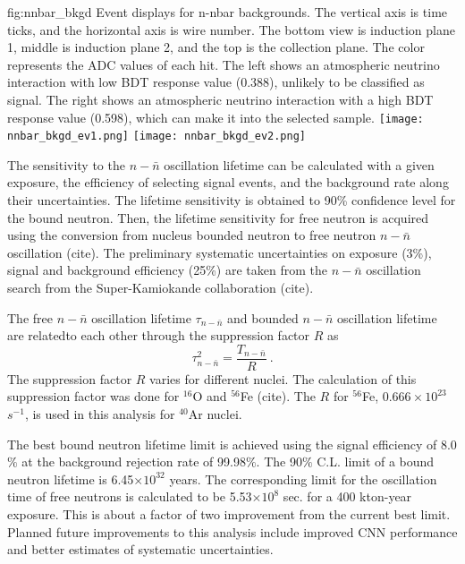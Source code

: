 \begin{dunefigure}
{fig:nnbar_bkgd}
{Event displays for n-nbar backgrounds.  The vertical axis is time ticks, and the horizontal axis is wire number.  The bottom view is induction plane 1, middle is induction plane 2, and the top is the collection plane.  The color represents the ADC values of each hit.  The left shows an atmospheric neutrino interaction with low BDT response value (0.388), unlikely to be classified as signal.  The right shows an atmospheric neutrino interaction with a high BDT response value (0.598), which can make it into the selected sample.}
\texttt{[image: nnbar\_bkgd\_ev1.png]}
\texttt{[image: nnbar\_bkgd\_ev2.png]}
\end{dunefigure} 

The sensitivity to the $n-\bar{n}$ oscillation lifetime can be calculated with a given exposure, the efficiency of selecting signal events, and the background rate along their uncertainties. The lifetime sensitivity is obtained to 90\% confidence level for the bound neutron. Then, the lifetime sensitivity for free neutron is acquired using the conversion from nucleus bounded neutron to free neutron $n-\bar{n}$ oscillation (cite).  The preliminary systematic uncertainties on exposure (3\%), signal and background efficiency (25\%) are taken from the $n-\bar{n}$ oscillation search from the Super-Kamiokande collaboration (cite).

The free $n-\bar{n}$ oscillation lifetime $\tau_{n-\bar{n}}$ and bounded $n-\bar{n}$ oscillation lifetime are relatedto each other through the suppression factor $R$ as
\begin{equation}
    \tau^{2}_{n-\bar{n}} = \frac{T_{n-\bar{n}}}{R} ~.
    \label{eq:tau}
\end{equation}
The suppression factor $R$ varies for different nuclei. The calculation of this suppression factor was done for $^{16}$O and $^{56}$Fe (cite). The $R$ for $^{56}$Fe, $0.666\times10^{23}$ $s^{-1}$, is used in this analysis for $^{40}$Ar nuclei.

The best bound neutron lifetime limit is achieved using the signal efficiency of 8.0$\%$ at the background rejection rate of 99.98$\%$. The 90$\%$ C.L. limit of a bound neutron lifetime is 6.45$\times 10^{32}$ years. The corresponding  limit for the oscillation time of free neutrons is calculated to be 5.53$\times 10^{8}$ sec. for a 400 kton-year exposure. This is about a factor of two improvement from the current best limit\cite{intranuclear}.  Planned future improvements to this analysis include improved CNN performance and better estimates of systematic uncertainties.

